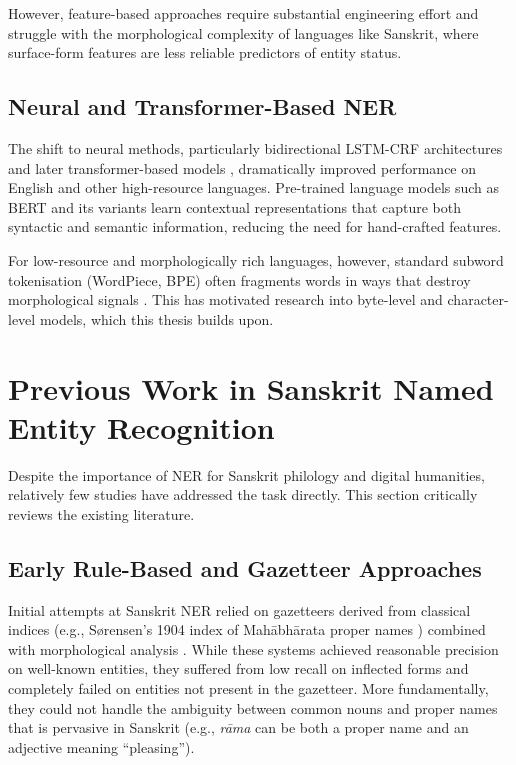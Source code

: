 However, feature-based approaches require substantial engineering effort and struggle with the morphological complexity of languages like Sanskrit, where surface-form features are less reliable predictors of entity status.

\subsection{Neural and Transformer-Based NER}
\label{subsec:neural_ner}

The shift to neural methods, particularly bidirectional LSTM-CRF architectures \cite{huang2015bilstm} and later transformer-based models \cite{devlin2019bert}, dramatically improved performance on English and other high-resource languages. Pre-trained language models such as BERT and its variants learn contextual representations that capture both syntactic and semantic information, reducing the need for hand-crafted features.

For low-resource and morphologically rich languages, however, standard subword tokenisation (WordPiece, BPE) often fragments words in ways that destroy morphological signals \cite{sennrich2016bpe}. This has motivated research into byte-level and character-level models, which this thesis builds upon.

\section{Previous Work in Sanskrit Named Entity Recognition}
\label{sec:sanskrit_ner}

Despite the importance of NER for Sanskrit philology and digital humanities, relatively few studies have addressed the task directly. This section critically reviews the existing literature.

\subsection{Early Rule-Based and Gazetteer Approaches}
\label{subsec:early_sanskrit_ner}

Initial attempts at Sanskrit NER relied on gazetteers derived from classical indices (e.g., Sørensen's 1904 index of Mahābhārata \cite{mahabharata} proper names \cite{sorensen1904index}) combined with morphological analysis \cite{jha2010ner}. While these systems achieved reasonable precision on well-known entities, they suffered from low recall on inflected forms and completely failed on entities not present in the gazetteer. More fundamentally, they could not handle the ambiguity between common nouns and proper names that is pervasive in Sanskrit (e.g., \textit{rāma} can be both a proper name and an adjective meaning ``pleasing'').

